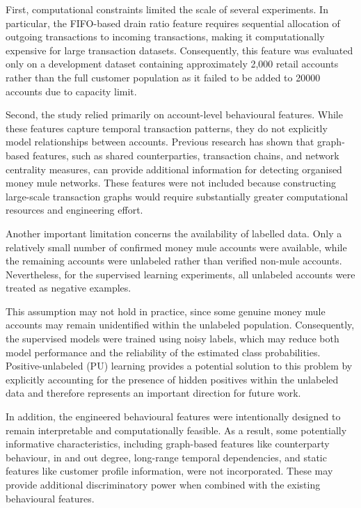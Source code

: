 First, computational constraints limited the scale of several experiments. In particular,
the FIFO-based drain ratio feature requires sequential allocation of outgoing
transactions to incoming transactions, making it computationally expensive for large
transaction datasets. Consequently, this feature was evaluated only on a development
dataset containing approximately 2,000 retail accounts rather than the full customer
population as it failed to be added to 20000 accounts due to capacity limit.

Second, the study relied primarily on account-level behavioural features. While these
features capture temporal transaction patterns, they do not explicitly model relationships
between accounts. Previous research has shown that graph-based features, such as
shared counterparties, transaction chains, and network centrality measures, can provide
additional information for detecting organised money mule networks. These features
were not included because constructing large-scale transaction graphs would require
substantially greater computational resources and engineering effort.

Another important limitation concerns the availability of labelled data.
Only a relatively small number of confirmed money mule accounts were
available, while the remaining accounts were unlabeled rather than
verified non-mule accounts. Nevertheless, for the supervised learning
experiments, all unlabeled accounts were treated as negative examples.

This assumption may not hold in practice, since some genuine money mule
accounts may remain unidentified within the unlabeled population.
Consequently, the supervised models were trained using noisy labels,
which may reduce both model performance and the reliability of the
estimated class probabilities. Positive-unlabeled (PU) learning provides
a potential solution to this problem by explicitly accounting for the
presence of hidden positives within the unlabeled data and therefore
represents an important direction for future work.

In addition, the engineered behavioural features were intentionally designed to remain
interpretable and computationally feasible. As a result, some potentially informative
characteristics, including graph-based features like counterparty behaviour, in and out degree, long-range temporal
dependencies, and static features like customer profile information, were not incorporated. These may provide additional discriminatory power when combined with the existing behavioural
features.
